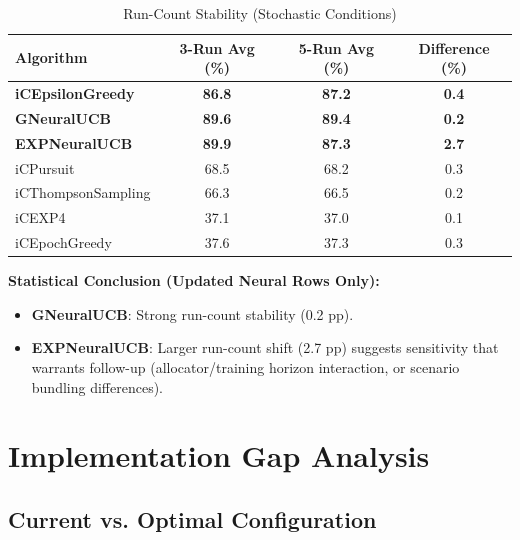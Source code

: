 \documentclass[12pt,a4paper]{article}
\newcommand{\success}[1]{\textcolor{accentgreen}{\textbf{#1}}}
\newcommand{\legacy}[1]{\textcolor{legacycolor}{\textbf{#1}}}
\newcommand{\neural}[1]{\textcolor{neuralcolor}{\textbf{#1}}}
\begin{document}
\begin{table}[H]
\centering
\caption{Run-Count Stability (Stochastic Conditions)}
\label{tab:run-count}
\begin{tabular}{@{}lccc@{}}
\toprule
\textbf{Algorithm} & \textbf{3-Run Avg (\%)} & \textbf{5-Run Avg (\%)} & \textbf{Difference (\%)} \\
\midrule
\success{iCEpsilonGreedy}   & \success{86.8} & \success{87.2} & \success{0.4} \\
\neural{GNeuralUCB}        & \neural{89.6} & \neural{89.4} & \neural{0.2} \\
\legacy{EXPNeuralUCB}       & \legacy{89.9} & \legacy{87.3} & \legacy{2.7} \\
iCPursuit                   & 68.5 & 68.2 & 0.3 \\
iCThompsonSampling          & 66.3 & 66.5 & 0.2 \\
iCEXP4                      & 37.1 & 37.0 & 0.1 \\
iCEpochGreedy               & 37.6 & 37.3 & 0.3 \\
\bottomrule
\end{tabular}
\end{table}

\textbf{Statistical Conclusion (Updated Neural Rows Only):}
\begin{itemize}
\item \neural{GNeuralUCB}: Strong run-count stability (0.2 pp).
\item \legacy{EXPNeuralUCB}: Larger run-count shift (2.7 pp) suggests sensitivity that warrants follow-up (allocator/training horizon interaction, or scenario bundling differences).
\end{itemize}

\section{Implementation Gap Analysis}

\subsection{Current vs. Optimal Configuration}
\end{document}
